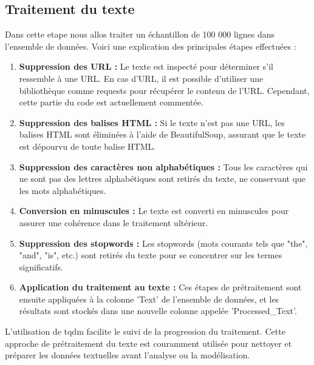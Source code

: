 
\subsection{Traitement du texte}
Dans cette etape nous allos traiter un échantillon de 100 000 lignes dans l'ensemble de données. Voici une explication des principales étapes effectuées :

\begin{enumerate}
    \item \textbf{Suppression des URL :} Le texte est inspecté pour déterminer s'il ressemble à une URL. En cas d'URL, il est possible d'utiliser une bibliothèque comme requests pour récupérer le contenu de l'URL. Cependant, cette partie du code est actuellement commentée.
    
    \item \textbf{Suppression des balises HTML :} Si le texte n'est pas une URL, les balises HTML sont éliminées à l'aide de BeautifulSoup, assurant que le texte est dépourvu de toute balise HTML.
    
    \item \textbf{Suppression des caractères non alphabétiques :} Tous les caractères qui ne sont pas des lettres alphabétiques sont retirés du texte, ne conservant que les mots alphabétiques.
    
    \item \textbf{Conversion en minuscules :} Le texte est converti en minuscules pour assurer une cohérence dans le traitement ultérieur.
    
    \item \textbf{Suppression des stopwords :} Les stopwords (mots courants tels que "the", "and", "is", etc.) sont retirés du texte pour se concentrer sur les termes significatifs.
    
    \item \textbf{Application du traitement au texte :} Ces étapes de prétraitement sont ensuite appliquées à la colonne 'Text' de l'ensemble de données, et les résultats sont stockés dans une nouvelle colonne appelée 'Processed\_Text'.
\end{enumerate}

L'utilisation de tqdm facilite le suivi de la progression du traitement. Cette approche de prétraitement du texte est couramment utilisée pour nettoyer et préparer les données textuelles avant l'analyse ou la modélisation.
